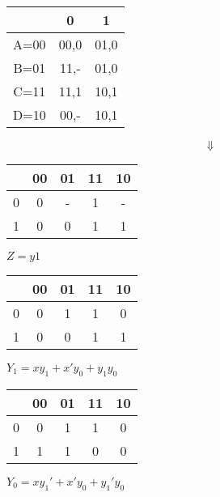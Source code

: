 \documentclass{article}
\begin{document}
\begin{center}
\begin{tabular}{ |c|c|c| }
\hline
& 0 & 1 \\
\hline
\hline
A=00 & 00,0 & 01,0 \\
B=01 & 11,- & 01,0 \\
C=11 & 11,1 & 10,1 \\
D=10 & 00,- & 10,1 \\
\hline
\end{tabular}

$$\Downarrow$$

\begin{multicols}{2}
\begin{tabular}{ |c|c|c|c|c| }
\hline
& 00 & 01 & 11 & 10 \\
\hline
\hline
0 & 0 & - & 1 & - \\
1 & 0 & 0 & 1 & 1 \\
\hline
\end{tabular}

$Z = y1$
\end{multicols}

\begin{multicols}{2}
\begin{tabular}{ |c|c|c|c|c| }
\hline
& 00 & 01 & 11 & 10 \\
\hline
\hline
0 & 0 & 1 & 1 & 0 \\
1 & 0 & 0 & 1 & 1 \\
\hline
\end{tabular}

$Y_1 = xy_1 + x'y_0 + y_1y_0$
\end{multicols}

\begin{multicols}{2}
\begin{tabular}{ |c|c|c|c|c| }
\hline
& 00 & 01 & 11 & 10 \\
\hline
\hline
0 & 0 & 1 & 1 & 0 \\
1 & 1 & 1 & 0 & 0 \\
\hline
\end{tabular}

$Y_0 = xy_1' + x'y_0 + y_1'y_0$
\end{multicols}
\end{center}
\end{document}
